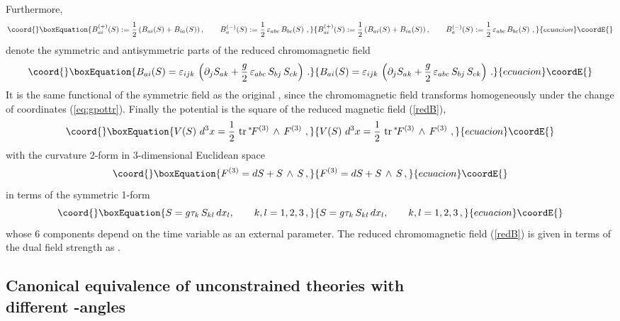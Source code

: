\documentclass[a4paper,12pt]{article}
\begin{document}
Furthermore,
\begin{equation}\coord{}\boxEquation{
\label{symasymB}
B^{(+)}_{ai}(S) := \frac{1}{2}\,(B_{ai}(S) + B_{ia}(S))\,, \qquad
B^{(-)}_a (S):= \frac{1}{2}\,\varepsilon_{abc} \, B_{bc}(S)~,
}{
B^{(+)}_{ai}(S) := \frac{1}{2}\,(B_{ai}(S) + B_{ia}(S))\,, \qquad
B^{(-)}_a (S):= \frac{1}{2}\,\varepsilon_{abc} \, B_{bc}(S)~,
}{ecuacion}\coordE{}\end{equation}
denote the symmetric and antisymmetric
parts of the reduced chromomagnetic field
\begin{equation}\coord{}\boxEquation{
\label{redB}
B_{ai}(S) = \varepsilon_{ijk}\,
\left(\partial_j S_{ak} + \frac{g}{2}\,
\varepsilon_{abc}\, S_{bj}\, S_{ck}\right)\,.
}{
B_{ai}(S) = \varepsilon_{ijk}\,
\left(\partial_j S_{ak} + \frac{g}{2}\,
\varepsilon_{abc}\, S_{bj}\, S_{ck}\right)\,.
}{ecuacion}\coordE{}\end{equation}
It is the same functional of the symmetric field \coordHE{} as the original
\coordHE{}, since the chromomagnetic field transforms homogeneously
under the change of coordinates (\ref{eq:gpottr}).
Finally the potential \coordHE{} is the square of the reduced magnetic field
(\ref{redB}),
\begin{equation}\coord{}\boxEquation{
\label{V(S)}
V(S)\ d^3x = \frac{1}{2} \ \mbox{tr}\,{}^\ast\! F^{(3)}\,\wedge \, F^{(3)}~,
}{
V(S)\ d^3x = \frac{1}{2} \ \mbox{tr}\,{}^\ast\! F^{(3)}\,\wedge \, F^{(3)}~,
}{ecuacion}\coordE{}\end{equation}
with the curvature 2-form in 3-dimensional Euclidean space
\begin{equation}\coord{}\boxEquation{
\label{3F}
 F^{(3)} = d S + S\, \wedge\, S\,,
}{
F^{(3)} = d S + S\, \wedge\, S\,,
}{ecuacion}\coordE{}\end{equation}
in terms of the symmetric 1-form
\begin{equation}\coord{}\boxEquation{
\label{3S}
S = g\tau_k\, S_{kl} \, dx_l, \qquad k, l = 1,2,3\,,
}{
S = g\tau_k\, S_{kl} \, dx_l, \qquad k, l = 1,2,3\,,
}{ecuacion}\coordE{}\end{equation}
whose 6 components depend on the time variable as an external parameter.
The reduced chromomagnetic field (\ref{redB}) is given in terms of the
dual field strength \coordHE{} as
\coordHE{}.


\subsection{Canonical equivalence of unconstrained theories with \\
 different \myHighlight{$\theta$}\coordHE{}-angles}
\end{document}
